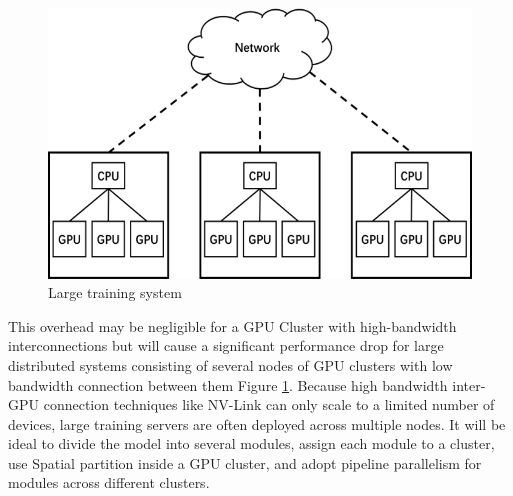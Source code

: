 \documentclass[sigplan, nonacm]{acmart}\settopmatter{printfolios=true,printccs=false,printacmref=false}
\begin{document}
 \begin{figure}[htbp]
  \centering
  \includegraphics[scale=0.7]{networktopo.png}
  \caption{Large training system}
  \label{fig:networktopo}
\end{figure} This overhead may be negligible for a GPU Cluster with high-bandwidth interconnections but will cause a significant performance drop for large distributed systems consisting of several nodes of GPU clusters with low bandwidth connection between them Figure \ref{fig:networktopo}. Because high bandwidth inter-GPU connection techniques like NV-Link can only scale to a limited number of devices, large training servers are often deployed across multiple nodes. It will be ideal to divide the model into several modules, assign each module to a cluster, use Spatial partition inside a GPU cluster, and adopt pipeline parallelism for modules across different clusters.\par
\end{document}
